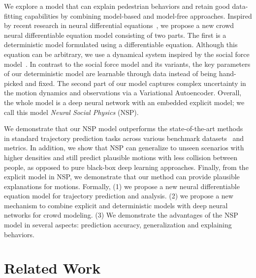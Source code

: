 \documentclass[runningheads]{llncs}
\begin{document}
We explore a model that can explain pedestrian behaviors and retain good data-fitting capabilities by combining model-based and model-free approaches. Inspired by recent research in neural differential equations~\cite{chen2018neural,rackauckas2020universal,zhong2019symplectic,zubov2021NeuralPDE,kidger_neural_2022}, we propose a new crowd neural differentiable equation model consisting of two parts. The first is a deterministic model formulated using a differentiable equation. Although this equation can be arbitrary, we use a dynamical system inspired by the social force model~\cite{helbing1995social}. In contrast to the social force model and its variants, the key parameters of our deterministic model are learnable through data instead of being hand-picked and fixed. The second part of our model captures complex uncertainty in the motion dynamics and observations via a Variational Autoencoder. Overall, the whole model is a deep neural network with an embedded explicit model; we call this model \textit{Neural Social Physics} (NSP).

We demonstrate that our NSP model outperforms the state-of-the-art methods~\cite{gupta2018social,sadeghian2019sophie,bhattacharyya2019conditional,li2019conditional,liang2019peeking,deo2020trajectory,liang2020simaug,mangalam2020not,salzmann2020trajectron++,liang2020garden,mangalam2021goals,su2021pedestrian,zhou2021sliding,gao2022social,xia2022cscnet} in standard trajectory prediction tasks across various benchmark datasets~\cite{robicquet2016learning,pellegrini2010improving,lerner2007crowds} and metrics. In addition, we show that NSP can generalize to unseen scenarios with higher densities and still predict plausible motions with less collision between people, as opposed to pure black-box deep learning approaches. Finally, from the explicit model in NSP, we demonstrate that our method can provide plausible explanations for motions. 
Formally, (1) we propose a new neural differentiable equation model for trajectory prediction and analysis. (2) we propose a new mechanism to combine explicit and deterministic models with deep neural networks for crowd modeling. (3) We demonstrate the advantages of the NSP model in several aspects: prediction accuracy, generalization and explaining behaviors.

\section{Related Work}
\end{document}
